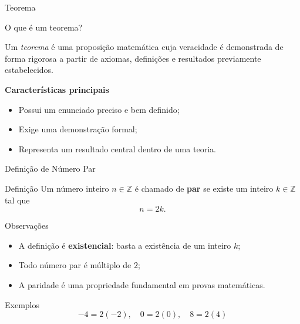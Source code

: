 \documentclass[9pt]{beamer}
\begin{document}
\begin{frame}{Teorema}
\begin{block}{O que é um teorema?}


Um \emph{teorema} é uma proposição matemática
cuja veracidade é demonstrada de forma rigorosa
a partir de axiomas, definições e resultados previamente estabelecidos.
    \end{block}

\vspace{0.4cm}

\textbf{Características principais}

\begin{itemize}
\item Possui um enunciado preciso e bem definido;
\item Exige uma demonstração formal;
\item Representa um resultado central dentro de uma teoria.
\end{itemize}

\end{frame}
\begin{frame}{Definição de Número Par}

\begin{block}{Definição}
Um número inteiro \( n \in \mathbb{Z} \) é chamado de \textbf{par} se existe
um inteiro \( k \in \mathbb{Z} \) tal que
\[
n = 2k.
\]
\end{block}

\vspace{0.4cm}

\begin{block}{Observações}
\begin{itemize}
\item A definição é \textbf{existencial}: basta a existência de um inteiro \(k\);
\item Todo número par é múltiplo de \(2\);
\item A paridade é uma propriedade fundamental em provas matemáticas.
\end{itemize}
\end{block}

\vspace{0.4cm}

\begin{block}{Exemplos}
\[
-4 = 2(-2), \quad 0 = 2(0), \quad 8 = 2(4)
\]
\end{block}

\end{frame}
\end{document}
